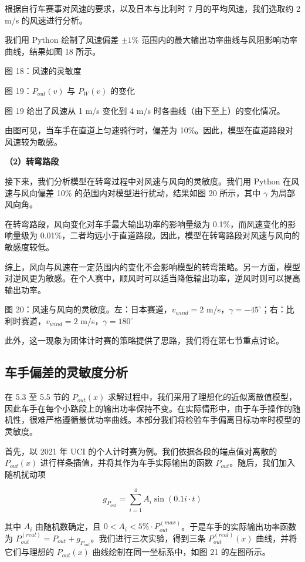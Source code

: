 \documentclass[11pt,a4paper]{ctexart}
\begin{document}
根据自行车赛事对风速的要求，以及日本与比利时 7 月的平均风速，我们选取约 2 m/s 的风速进行分析。

我们用 Python 绘制了风速偏差 $\pm 1\%$ 范围内的最大输出功率曲线与风阻影响功率曲线，结果如图 18 所示。

图 18：风速的灵敏度

图 19：$P_{out}(v)$ 与 $P_W(v)$ 的变化

图 19 给出了风速从 1 m/s 变化到 4 m/s 时各曲线（由下至上）的变化情况。

由图可见，当车手在直道上匀速骑行时，偏差为 10\%。因此，模型在直道路段对风速较为敏感。

\textbf{（2）转弯路段}

接下来，我们分析模型在转弯过程中对风速与风向的灵敏度。我们用 Python 在风速与风向偏差 10\% 的范围内对模型进行扰动，结果如图 20 所示，其中 $\gamma$ 为局部风向角。

在转弯路段，风向变化对车手最大输出功率的影响量级为 0.1\%，而风速变化的影响量级为 0.01\%，二者均远小于直道路段。因此，模型在转弯路段对风速与风向的敏感度较低。

综上，风向与风速在一定范围内的变化不会影响模型的转弯策略。另一方面，模型对逆风更为敏感。在个人赛中，顺风时可以适当降低输出功率，逆风时则可以提高输出功率。

图 20：风速与风向的灵敏度。左：日本赛道，$v_{wind}=2$ m/s，$\gamma=-45^{\circ}$；右：比利时赛道，$v_{wind}=2$ m/s，$\gamma=180^{\circ}$

此外，这一现象为团体计时赛的策略提供了思路，我们将在第七节重点讨论。

\subsection{车手偏差的灵敏度分析}

在 5.3 至 5.5 节的 $P_{out}(x)$ 求解过程中，我们采用了理想化的近似离散值模型，因此车手在每个小路段上的输出功率保持不变。在实际情形中，由于车手操作的随机性，很难严格遵循最优功率曲线。本部分我们将检验车手偏离目标功率时模型的灵敏度。

首先，以 2021 年 UCI 的个人计时赛为例。我们依据各段的端点值对离散的 $P_{out}(x)$ 进行样条插值，并将其作为车手实际输出的函数 $P_{out}$。随后，我们加入随机扰动项

\[
g_{P_{out}}=\sum_{i=1}^{4}A_i\sin\left(0.1i\cdot t\right)
\]

其中 $A_i$ 由随机数确定，且 $0<A_i<5\%\cdot P_{out}^{(max)}$。于是车手的实际输出功率函数为 $P_{out}^{(real)}=P_{out}+g_{P_{out}}$。我们进行三次实验，得到三条 $P_{out}^{(real)}(x)$ 曲线，并将它们与理想的 $P_{out}(x)$ 曲线绘制在同一坐标系中，如图 21 的左图所示。
\end{document}
